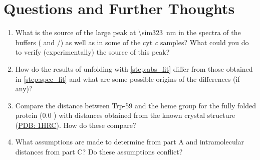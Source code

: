 
\section{Questions and Further Thoughts} %
\label{sec:questions_and_further_thoughts}

\begin{enumerate}
	\item What is the source of the large peak at \qty{\sim323}{\nm} in the spectra of the buffers ( and /) as well as in some of the cyt \emph{c} samples?
	What could you do to verify (experimentally) the source of this peak?
	\item How do the results of unfolding with \cref{step:abs_fit} differ from those obtained in \cref{step:spec_fit} and what are some possible origins of the differences (if any)?
	\item Compare the distance between Trp-59 and the heme group for the fully folded protein (\qty{0.0}{\Molar} ) with distances obtained from the known crystal structure (\href{https://www.rcsb.org/structure/1hrc}{PDB: 1HRC}). 
	How do these compare?
	\item What assumptions are made to determine \gibbs*[subscript-right=\ch{H2O}]{} from part A and intramolecular distances from part C? 
	Do these assumptions conflict?

\end{enumerate}


